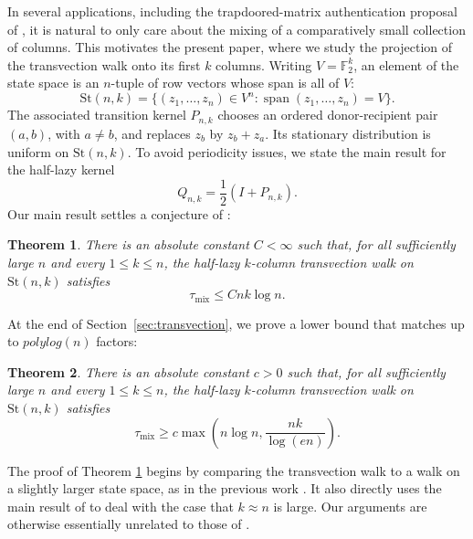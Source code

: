 \documentclass[11pt, reqno]{amsart}
\numberwithin{equation}{section}
\newtheorem{theorem}{Theorem}[section]
\newcommand{\Ft}{\mathbb F_2}
\newcommand{\Stief}[2]{\mathrm{St}(#1,#2)}
\newcommand{\Span}{\operatorname{span}}
\begin{document}
In several applications, including the trapdoored-matrix authentication proposal of \cite{sotirakitrap}, it is natural to only care about the mixing of a comparatively
small collection of columns. This motivates the present paper, where we study the projection of the transvection walk onto its first \(k\)
columns.  Writing \(V=\Ft^k\), an element of the state space is an \(n\)-tuple of row vectors whose
span is all of \(V\):
\[
\Stief{n}{k}
=\{(z_1,\ldots,z_n)\in V^n:\Span(z_1,\ldots,z_n)=V\}.
\]
The associated transition kernel \(P_{n,k}\) chooses an ordered donor-recipient
pair \((a,b)\), with \(a\ne b\), and replaces \(z_b\) by \(z_b+z_a\).  Its
stationary distribution is uniform on \(\Stief{n}{k}\).  To avoid periodicity
issues, we state the main result for the half-lazy kernel
\[
    Q_{n,k}=\frac12(I+P_{n,k}).
\]
Our main result settles a conjecture of \cite{BenHamouPeres2018}:

\begin{theorem}\label{thm:intro-transvection-main}
There is an absolute constant \(C<\infty\) such that, for all sufficiently large
\(n\) and every \(1\le k\le n\), the half-lazy \(k\)-column transvection walk on
\(\Stief{n}{k}\) satisfies
\[
    \tau_{\mathrm{mix}}\le C nk\log n .
\]
\end{theorem}

At the end of Section~\ref{sec:transvection}, we prove a lower bound that matches up to $polylog(n)$ factors:

\begin{theorem}\label{thm:intro-transvection-lower}
There is an absolute constant \(c>0\) such that, for all sufficiently large
\(n\) and every \(1\le k\le n\), the half-lazy \(k\)-column transvection walk on
\(\Stief{n}{k}\) satisfies
\[
    \tau_{\mathrm{mix}}
    \ge c\max\left(n\log n,\frac{nk}{\log(e n)}\right).
\]
\end{theorem}


The proof of Theorem \ref{thm:intro-transvection-main} begins by comparing the transvection walk to a walk on a slightly larger state space, as in the previous work \cite{BenHamou2025}. It also directly uses the main result of \cite{BenHamou2025} to deal with the case that $k \approx n$ is large. Our arguments are otherwise  essentially unrelated to those of \cite{BenHamou2025}. 
\end{document}
